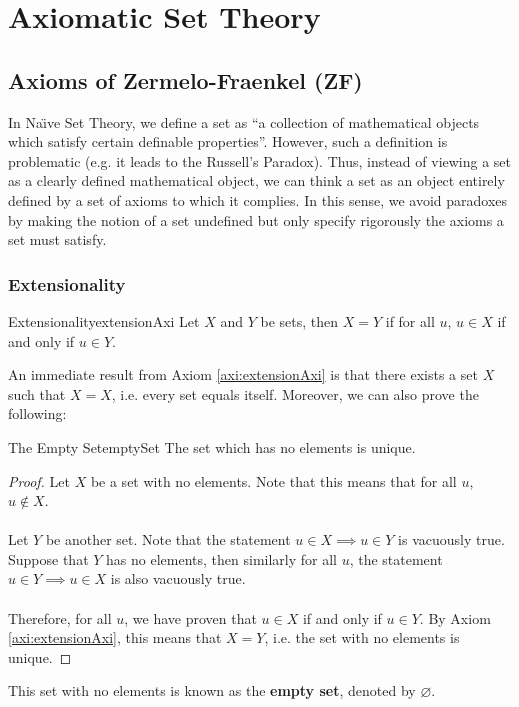 \documentclass[math]{amznotes}
\theoremstyle{remark}
\begin{document}
\chapter{Axiomatic Set Theory}
\section{Axioms of Zermelo-Fraenkel (ZF)}
In Na\"\i ve Set Theory, we define a set as ``a collection of mathematical objects which satisfy certain definable properties''. However, such a definition is problematic (e.g. it leads to the Russell's Paradox). Thus, instead of viewing a set as a clearly defined mathematical object, we can think a set as an object entirely defined by a set of axioms to which it complies. In this sense, we avoid paradoxes by making the notion of a set undefined but only specify rigorously the axioms a set must satisfy.
\subsection{Extensionality}
\begin{axibox}{Extensionality}{extensionAxi}
    Let $X$ and $Y$ be sets, then $X = Y$ if for all $u$, $u \in X$ if and only if $u \in Y$.
\end{axibox}
An immediate result from Axiom \ref{axi:extensionAxi} is that there exists a set $X$ such that $X = X$, i.e. every set equals itself. Moreover, we can also prove the following:
\begin{thmbox}{The Empty Set}{emptySet}
    The set which has no elements is unique.
    \tcblower   
    \begin{proof}
        Let $X$ be a set with no elements. Note that this means that for all $u$, $u \notin X$.
        \\\\
        Let $Y$ be another set. Note that the statement $u \in X \implies u \in Y$ is vacuously true. Suppose that $Y$ has no elements, then similarly for all $u$, the statement~$u \in Y \implies u \in X$ is also vacuously true. 
        \\\\
        Therefore, for all $u$, we have proven that $u \in X$ if and only if $u \in Y$. By Axiom \ref{axi:extensionAxi}, this means that $X = Y$, i.e. the set with no elements is unique.
    \end{proof}
\end{thmbox}
This set with no elements is known as the {\color{red} \textbf{empty set}}, denoted by $\varnothing$.
\end{document}

